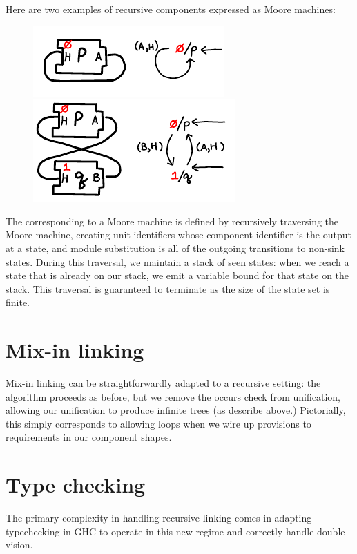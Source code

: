 Here are two examples of recursive components expressed as Moore
machines:

\begin{figure}[H]
\center\includegraphics{figures/moore-p.pdf}
\hspace{3em}
\includegraphics{figures/moore-pq.pdf}
\end{figure}

\noindent
The \uid{} corresponding to a Moore machine is defined by
recursively traversing the Moore machine, creating unit identifiers
whose component identifier is the output at a state, and module
substitution is all of the outgoing transitions to non-sink states. During
this traversal, we maintain a stack of seen states:  when we reach a
state that is already on our stack, we emit a variable bound
for that state on the stack.  This traversal
is guaranteed to terminate as the size of the state set is finite.

\section{Mix-in linking}

Mix-in linking can be straightforwardly adapted to a recursive
setting: the algorithm proceeds as before, but we remove the
occurs check from unification, allowing our unification to
produce infinite trees (as describe above.)  Pictorially,
this simply corresponds to allowing loops when we wire up provisions
to requirements in our component shapes.

\section{Type checking}

The primary complexity in handling recursive linking comes in adapting
typechecking in GHC to operate in this new regime and correctly
handle double vision.


